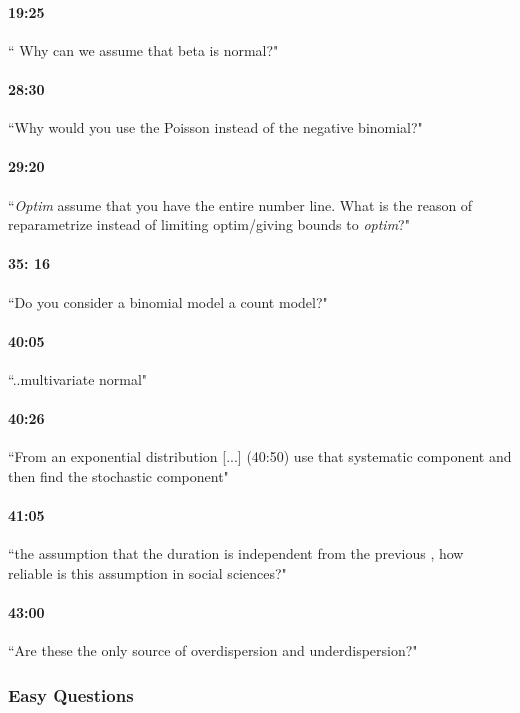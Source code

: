 \documentclass[11pt]{article}
\begin{document}
\paragraph{19:25} `` Why can we assume that beta is normal?"
\paragraph{28:30} ``Why would you use the Poisson instead of the negative binomial?"
\paragraph{29:20} ``\textit{Optim }assume that you have the entire number line. What is the reason of reparametrize instead of limiting optim/giving bounds to \textit{optim}?"
\paragraph{35: 16} ``Do you consider a binomial model a count model?"
\paragraph{40:05} ``..multivariate normal"
\paragraph{40:26} ``From an exponential distribution [...] (40:50) use that systematic component and then find the stochastic component"
\paragraph{41:05} ``the assumption that the duration is independent from the previous , how reliable is this assumption in social sciences?"
\paragraph{43:00} ``Are these the only source of overdispersion and underdispersion?"

\subsubsection{Easy Questions}
\end{document}
